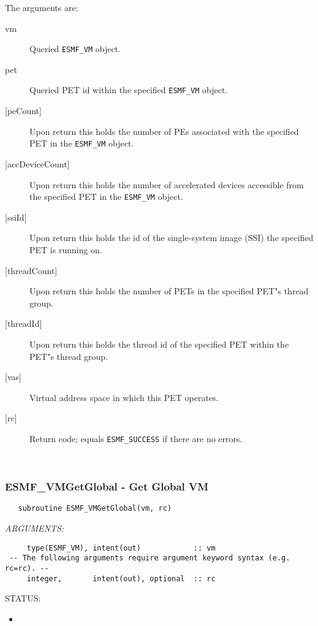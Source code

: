      The arguments are:
     \begin{description}
     \item[vm] 
           Queried {\tt ESMF\_VM} object.
     \item[pet] 
           Queried PET id within the specified {\tt ESMF\_VM} object.
     \item[{[peCount]}]
          Upon return this holds the number of PEs associated with the specified
          PET in the {\tt ESMF\_VM} object.
     \item[{[accDeviceCount]}]
          Upon return this holds the number of accelerated devices accessible
          from the specified PET in the {\tt ESMF\_VM} object.
     \item[{[ssiId]}]
          Upon return this holds the id of the single-system image (SSI) the
          specified PET is running on.
     \item[{[threadCount]}]
          Upon return this holds the number of PETs in the specified PET"s 
          thread group.
     \item[{[threadId]}]
          Upon return this holds the thread id of the specified PET within the 
          PET"s thread group.
     \item[{[vas]}]
          Virtual address space in which this PET operates.
     \item[{[rc]}] 
          Return code; equals {\tt ESMF\_SUCCESS} if there are no errors.
     \end{description}
   
 
\mbox{}\hrulefill\ 
 
\subsubsection [ESMF\_VMGetGlobal] {ESMF\_VMGetGlobal - Get Global VM}


 
\begin{verbatim}   subroutine ESMF_VMGetGlobal(vm, rc)\end{verbatim}{\em ARGUMENTS:}
\begin{verbatim}     type(ESMF_VM), intent(out)            :: vm
 -- The following arguments require argument keyword syntax (e.g. rc=rc). --
     integer,       intent(out), optional  :: rc           \end{verbatim}
{\sf STATUS:}
   \begin{itemize}
   \item{}
   \end{itemize}
  
